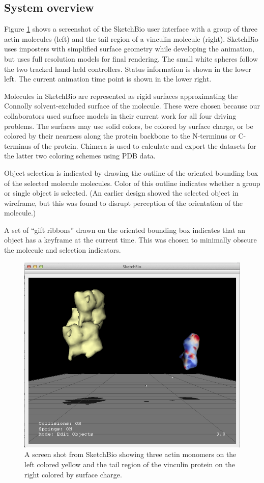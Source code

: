 \documentclass[twocolumn]{bmcart}%
\begin{document}
\subsection*{System overview}

Figure \ref{fig:actin_vinculin} shows a screenshot of the SketchBio user interface with a group of three actin molecules (left) and the tail region of a vinculin molecule (right).
SketchBio uses imposters with simplified surface geometry while developing the animation, but uses full resolution models for final rendering.
The small white spheres follow the two tracked hand-held controllers. Status information is shown in the lower left.
The current animation time point is shown in the lower right.

Molecules in SketchBio are represented as rigid surfaces approximating the Connolly solvent-excluded surface of the molecule.
These were chosen because our collaborators used surface models in their current work for all four driving problems.  The surfaces may use solid colors, be colored by surface charge, or be colored by their nearness along the protein backbone to the N-terminus or C-terminus of the protein.  Chimera is used to calculate and export the datasets for the latter two coloring schemes using PDB data.

Object selection is indicated by drawing the outline of the oriented bounding box of the selected molecule molecules. 
Color of this outline indicates whether a group or single object is selected.
(An earlier design showed the selected object in wireframe, but this was found to disrupt perception of the orientation of the molecule.)

A set of ``gift ribbons'' drawn on the oriented bounding box indicates that an object has a keyframe at the current time.
This was chosen to minimally obscure the molecule and selection indicators.

\begin{figure}[ht]
\centering
\includegraphics[width=0.9\columnwidth]{actinVinculin.png}
\caption{A screen shot from SketchBio showing three actin monomers on the left colored yellow and the tail region of the vinculin protein on the right colored by surface charge.}
\label{fig:actin_vinculin}
\end{figure}
\end{document}
